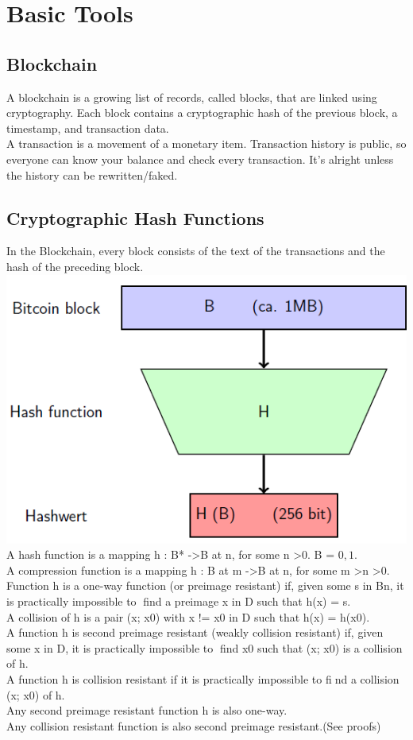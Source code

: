 \documentclass{article}
\begin{document}
\section{Basic Tools}
\subsection{Blockchain}
A blockchain is a growing list of records, called blocks, that are linked using cryptography. Each block contains a cryptographic hash of the previous block, a timestamp, and transaction data.\\
A transaction is a movement of a monetary item. Transaction history is public, so everyone can know your balance and check every transaction. It's alright unless the history can be rewritten/faked.

\subsection{Cryptographic Hash Functions}
In the Blockchain, every block consists of the text of the transactions and the hash of the preceding block.\\
\includegraphics[scale=0.6]{1.png}\\
A hash function is a mapping h : B* -\textgreater B at n, for some n \textgreater 0. B = ${0,1}$.\\
A compression function is a mapping h : B at m -\textgreater B at n, for some m \textgreater  n \textgreater 0.\\
Function h is a one-way function (or preimage resistant) if, given some s in Bn, it is practically impossible to find a preimage x in D such that h(x) = s.\\
A collision of h is a pair (x; x0) with x != x0 in D such that h(x) = h(x0).\\
A function h is second preimage resistant (weakly collision resistant) if, given some x in D, it is practically impossible to find x0 such that (x; x0) is a collision of h.\\
A function h is collision resistant if it is practically impossible to find a collision (x; x0) of h.\\
Any second preimage resistant function h is also one-way.\\
Any collision resistant function is also second preimage resistant.(See proofs)\\
\end{document}
